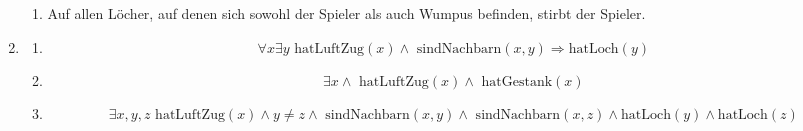 \documentclass[a4paper]{article}
\begin{document}
\begin{enumerate}
\begin{enumerate}
			\item
			Auf allen Löcher, auf denen sich sowohl der Spieler als auch Wumpus befinden, stirbt der Spieler.
		\end{enumerate}
		
		\item
		\begin{enumerate}
			\item
			\begin{equation*}
				\forall x \exists y \text{ hatLuftZug}(x) \land \text{ sindNachbarn}(x, y) \Rightarrow \text{hatLoch}(y)
			\end{equation*}
			
			\item
			\begin{equation*}
				\exists x \land \text{ hatLuftZug}(x) \land \text{ hatGestank}(x)
			\end{equation*}
			
			\item
			\begin{equation*}
				\exists x, y, z \text{ hatLuftZug}(x) \land y \neq z \land \text{ sindNachbarn}(x, y) \land \text{ sindNachbarn}(x, z) \land \text{hatLoch}(y) \land \text{hatLoch}(z)
			\end{equation*}
		\end{enumerate}
	\end{enumerate}
\end{document}
